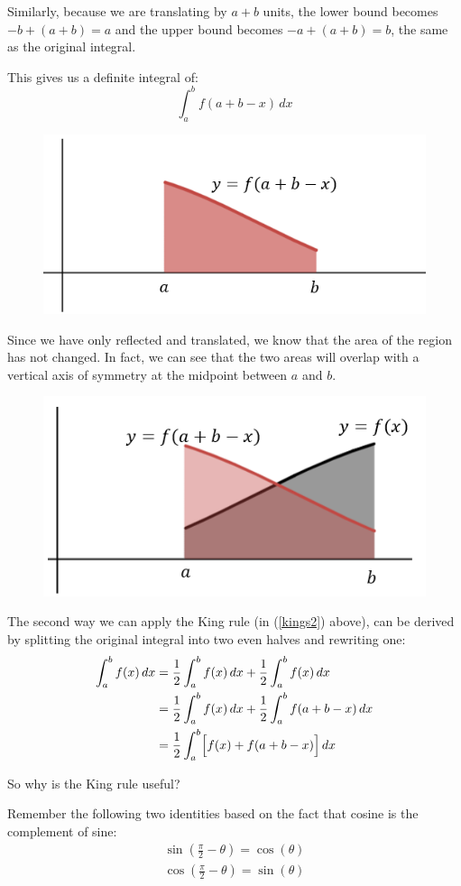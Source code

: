 \documentclass[../main.tex]{subfiles}
\begin{document}
Similarly, because we are translating by $a+b$ units, the lower bound becomes $-b+(a+b)=a$ and the upper bound becomes $-a+(a+b)=b$, the same as the original integral.

This gives us a definite integral of:
\[\int_{a}^{b} f(a+b-x)\,dx\]

\begin{figure}[h]
    \centering
    \includegraphics[width=0.4\linewidth]{images/kingsrule3.png}
\end{figure}

Since we have only reflected and translated, we know that the area of the region has not changed. In fact, we can see that the two areas will overlap with a vertical axis of symmetry at the midpoint between $a$ and $b$.

\begin{figure}[h]
    \centering
    \includegraphics[width=0.4\linewidth]{images/kingsrule4.png}
\end{figure}

The second way we can apply the King rule (in (\ref{kings2}) above), can be derived by splitting the original integral into two even halves and rewriting one:
\begin{align*}
    \int_{a}^{b} f(x)\,dx &= \frac{1}{2}\int_{a}^{b} f(x)\,dx + \frac{1}{2}\int_{a}^{b} f(x)\,dx \\
    &=\frac{1}{2}\int_{a}^{b} f(x)\,dx + \frac{1}{2}\int_{a}^{b} f(a+b-x)\, dx \\
    &= \frac{1}{2}\int_{a}^{b} \Bigl[f(x) + f(a+b-x)\Bigr]\, dx
\end{align*}

So why is the King rule useful? 

Remember the following two identities based on the fact that cosine is the complement of sine:
\begin{align*}
    \sin{(\frac{\pi}{2}-\theta)}=\cos{(\theta)}\\
    \cos{(\frac{\pi}{2}-\theta)}=\sin{(\theta)}
\end{align*}
\end{document}
